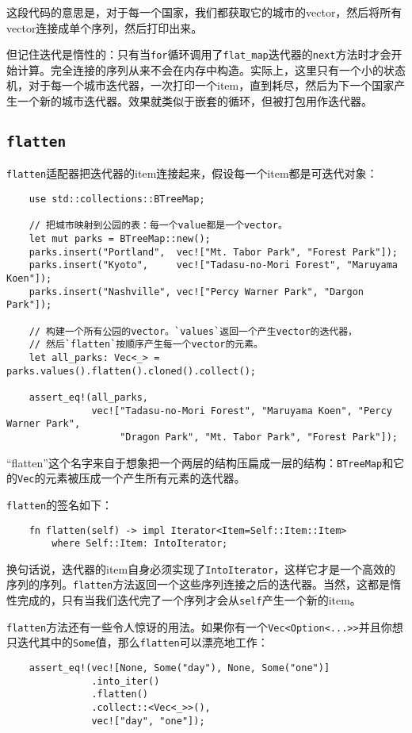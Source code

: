这段代码的意思是，对于每一个国家，我们都获取它的城市的vector，然后将所有vector连接成单个序列，然后打印出来。

但记住迭代是惰性的：只有当\texttt{for}循环调用了\texttt{flat\_map}迭代器的\texttt{next}方法时才会开始计算。完全连接的序列从来不会在内存中构造。实际上，这里只有一个小的状态机，对于每一个城市迭代器，一次打印一个item，直到耗尽，然后为下一个国家产生一个新的城市迭代器。效果就类似于嵌套的循环，但被打包用作迭代器。

\subsection{\texttt{flatten}}
\texttt{flatten}适配器把迭代器的item连接起来，假设每一个item都是可迭代对象：
\begin{verbatim}
    use std::collections::BTreeMap;

    // 把城市映射到公园的表：每一个value都是一个vector。
    let mut parks = BTreeMap::new();
    parks.insert("Portland",  vec!["Mt. Tabor Park", "Forest Park"]);
    parks.insert("Kyoto",     vec!["Tadasu-no-Mori Forest", "Maruyama Koen"]);
    parks.insert("Nashville", vec!["Percy Warner Park", "Dargon Park"]);

    // 构建一个所有公园的vector。`values`返回一个产生vector的迭代器，
    // 然后`flatten`按顺序产生每一个vector的元素。
    let all_parks: Vec<_> = parks.values().flatten().cloned().collect();

    assert_eq!(all_parks,
               vec!["Tadasu-no-Mori Forest", "Maruyama Koen", "Percy Warner Park", 
                    "Dragon Park", "Mt. Tabor Park", "Forest Park"]);
\end{verbatim}

“flatten”这个名字来自于想象把一个两层的结构压扁成一层的结构：\texttt{BTreeMap}和它的\texttt{Vec}的元素被压成一个产生所有元素的迭代器。

\texttt{flatten}的签名如下：
\begin{verbatim}
    fn flatten(self) -> impl Iterator<Item=Self::Item::Item>
        where Self::Item: IntoIterator;
\end{verbatim}

换句话说，迭代器的item自身必须实现了\texttt{IntoIterator}，这样它才是一个高效的序列的序列。\texttt{flatten}方法返回一个这些序列连接之后的迭代器。当然，这都是惰性完成的，只有当我们迭代完了一个序列才会从\texttt{self}产生一个新的item。

\texttt{flatten}方法还有一些令人惊讶的用法。如果你有一个\texttt{Vec<Option<...>>}并且你想只迭代其中的\texttt{Some}值，那么\texttt{flatten}可以漂亮地工作：
\begin{verbatim}
    assert_eq!(vec![None, Some("day"), None, Some("one")]
               .into_iter()
               .flatten()
               .collect::<Vec<_>>(),
               vec!["day", "one"]);
\end{verbatim}

